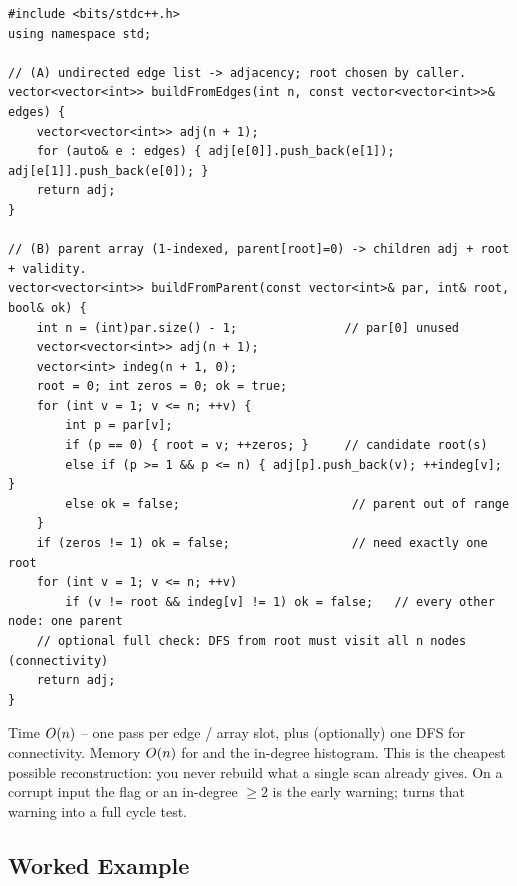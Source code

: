 \begin{lstlisting}[caption={Rebuild adjacency from an edge list or parent array, find the root, certify validity}, label={lst:c25-build}]
#include <bits/stdc++.h>
using namespace std;

// (A) undirected edge list -> adjacency; root chosen by caller.
vector<vector<int>> buildFromEdges(int n, const vector<vector<int>>& edges) {
    vector<vector<int>> adj(n + 1);
    for (auto& e : edges) { adj[e[0]].push_back(e[1]); adj[e[1]].push_back(e[0]); }
    return adj;
}

// (B) parent array (1-indexed, parent[root]=0) -> children adj + root + validity.
vector<vector<int>> buildFromParent(const vector<int>& par, int& root, bool& ok) {
    int n = (int)par.size() - 1;               // par[0] unused
    vector<vector<int>> adj(n + 1);
    vector<int> indeg(n + 1, 0);
    root = 0; int zeros = 0; ok = true;
    for (int v = 1; v <= n; ++v) {
        int p = par[v];
        if (p == 0) { root = v; ++zeros; }     // candidate root(s)
        else if (p >= 1 && p <= n) { adj[p].push_back(v); ++indeg[v]; }
        else ok = false;                        // parent out of range
    }
    if (zeros != 1) ok = false;                 // need exactly one root
    for (int v = 1; v <= n; ++v)
        if (v != root && indeg[v] != 1) ok = false;   // every other node: one parent
    // optional full check: DFS from root must visit all n nodes (connectivity)
    return adj;
}
\end{lstlisting}
\begin{complexitybox}
Time $O(n)$ -- one pass per edge / array slot, plus (optionally) one DFS for connectivity.
Memory $O(n)$ for  and the in-degree histogram. This is the cheapest possible
reconstruction: you never rebuild what a single scan already gives. On a corrupt input the
 flag or an in-degree $\ge 2$ is the early warning;  turns that
warning into a full cycle test.
\end{complexitybox}

\subsection{Worked Example}

